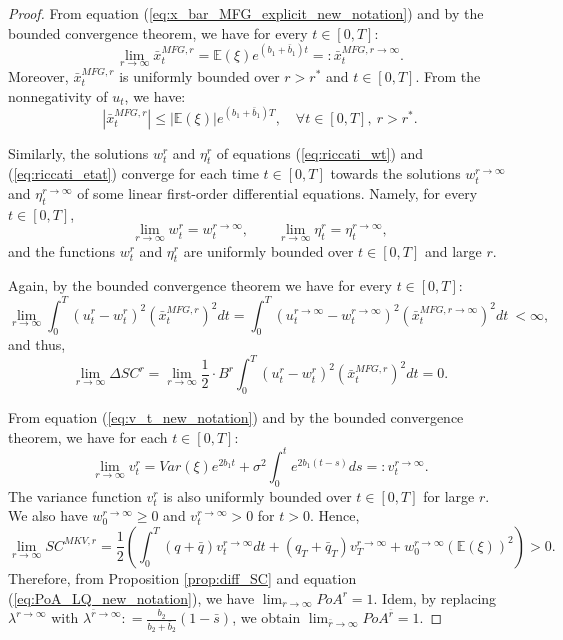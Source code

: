 \documentclass[11pt]{article}
\begin{document}
\begin{proof}
	From equation (\ref{eq:x_bar_MFG_explicit_new_notation}) and by the bounded convergence theorem, we have for every $t \in [0,T]$:
	\begin{equation*}
		\lim_{r\to \infty}\bar{x}_t^{MFG,r} = \mathbb{E}(\xi) e^{(b_1+ \bar{b}_1)t} =: \bar{x}_t^{MFG,r\to \infty}.
	\end{equation*}
	Moreover, $\bar{x}_t^{MFG,r}$ is uniformly bounded over $r>r^*$ and $t \in [0,T]$. From the nonnegativity of $u_t$, we have:
	$$ \left\vert \bar{x}^{MFG,r}_t \right\vert \leq \vert \mathbb{E}(\xi) \vert e^{ (b_1 + \bar{b}_1 ) T }, \quad \forall t \in [0,T],\ r>r^*. $$  
	
	Similarly, the solutions $w^r_t$ and $\eta^r_t$ of equations (\ref{eq:riccati_wt}) and (\ref{eq:riccati_etat}) converge for each time $t\in [0,T]$ towards the solutions $w^{r\to \infty}_t$ and $\eta_t^{r\to \infty}$ of some linear first-order differential equations. Namely, for every $t\in [0,T]$,
	$$\lim_{r\to \infty}w^r_t = w_t^{r\to \infty},\qquad \lim_{r\to \infty} \eta^r_t = \eta_t^{r\to \infty},$$
	and the functions $w^{r}_t$ and $\eta^{r}_t$ are uniformly bounded over $t \in[0,T]$ and large $r$.
	
	Again, by the bounded convergence theorem we have for every $t \in [0,T]$:
	\begin{equation*}
	\lim_{r \to \infty} \int_0^T (u^r_t - w^r_t)^2 (\bar{x}_t^{MFG,r})^2 dt = \int_0^T (u^{r \to \infty}_t- w^{r \to \infty}_t)^2 (\bar{x}_t^{MFG,r\to \infty})^2 dt \  < \infty,
	\end{equation*}
	and thus,
	\begin{equation*}
	\lim_{r \to \infty} \Delta SC^r = \lim_{r \to \infty} \frac{1}{2}\cdot B^r\int_0^T (u^r_t - w^r_t)^2 ( \bar{x}_t^{MFG,r})^2 dt = 0.
	\end{equation*}
	
	From equation (\ref{eq:v_t_new_notation}) and by the bounded convergence theorem, we have for each $t \in [0,T]$: 
	$$	\lim_{r\to \infty} v^r_t = Var(\xi)e^{2b_1 t} + \sigma^2 \int_0^t e^{2 b_1 (t-s) } ds =: v^{r \to \infty}_t.
	$$
	The variance function $v_t^{r}$ is also uniformly bounded over $t \in [0,T]$ for large $r$. We also have $w^{r \to \infty }_0\geq0$ and $v^{r \to \infty}_t >0$ for $t>0$. Hence,
	\begin{equation*}
		\lim_{r \to \infty} SC^{MKV,r} = \frac{1}{2} \left( \int_0^T (q+\bar{q}) v^{r \to \infty}_t dt + (q_T + \bar{q}_T) v^{r\to \infty}_T + w^{r \to \infty}_0 (\mathbb{E}(\xi))^2 \right)  >0.
	\end{equation*}
	Therefore, from Proposition \ref{prop:diff_SC} and equation (\ref{eq:PoA_LQ_new_notation}), we have $\displaystyle \lim_{r \to \infty} PoA^r = 1$. Idem, by replacing $\lambda^{r \to \infty}$ with $\lambda^{\bar{r} \to \infty}: = \frac{b_2}{b_2 + \bar{b}_2} (1 - \bar{s})$, we obtain $\displaystyle \lim_{\bar{r} \to \infty} PoA^{\bar{r}} = 1$.
	
\end{proof}
\end{document}
